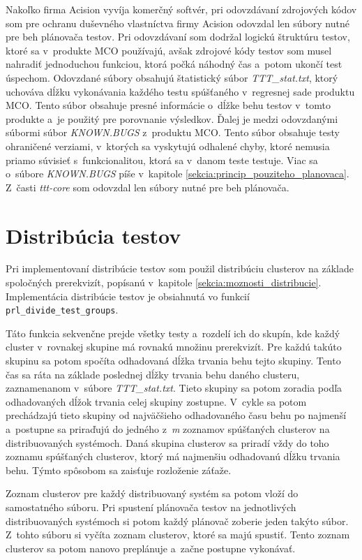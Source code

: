 Nakoľko firma Acision vyvíja komerčný softvér, pri odovzdávaní zdrojových 
kódov  som pre ochranu duševného vlastníctva firmy Acision odovzdal len 
súbory nutné pre beh plánovača testov. 
Pri odovzdávaní som dodržal logickú štruktúru testov, ktoré sa
v~produkte MCO používajú, avšak zdrojové kódy testov som musel nahradiť 
jednoduchou funkciou, ktorá počká náhodný čas a~potom ukončí test úspechom.
Odovzdané súbory obsahujú štatistický súbor \textit{TTT\_stat.txt}, 
ktorý uchováva dĺžku vykonávania každého testu spúšťaného v~regresnej 
sade produktu MCO. Tento súbor obsahuje presné informácie o~dĺžke
behu testov v~tomto produkte a~je použitý pre porovnanie výsledkov.
Ďalej je medzi odovzdanými súbormi súbor \textit{KNOWN.BUGS} z~produktu MCO. 
Tento súbor obsahuje testy ohraničené verziami, v~ktorých sa vyskytujú 
odhalené chyby, ktoré nemusia priamo súvisieť s~funkcionalitou, ktorá sa 
v~danom teste testuje. Viac sa o~súbore \textit{KNOWN.BUGS} píše v~kapitole 
\ref{sekcia:princip_pouziteho_planovaca}.
Z~časti \textit{ttt-core} som odovzdal len súbory nutné pre beh plánovača. 

\section{Distribúcia testov}
\label{sekcia:distribucia_testov}
Pri implementovaní distribúcie testov som použil distribúciu clusterov 
na základe spoločných prerekvizít, popísanú v~kapitole 
\ref{sekcia:moznosti_distribucie}.
Implementácia distribúcie testov je obsiahnutá vo funkcií 
\texttt{prl\_divide\_test\_groups}.

Táto funkcia sekvenčne prejde všetky testy a~rozdelí ich do skupín, 
kde každý cluster v~rovnakej skupine má rovnakú množinu prerekvizít. 
Pre každú takúto skupinu sa potom spočíta odhadovaná dĺžka trvania behu tejto skupiny.
Tento čas sa ráta na základe poslednej dĺžky trvania behu daného clusteru, 
zaznamenanom v~súbore \textit{TTT\_stat.txt}.
Tieto skupiny sa potom zoradia podľa odhadovaných dĺžok trvania celej 
skupiny zostupne. V~cykle sa potom prechádzajú tieto skupiny od 
najväčšieho odhadovaného času behu po najmenší a~postupne sa priraďujú 
do jedného z~\emph{m} zoznamov spúšťaných clusterov na distribuovaných systémoch.
Daná skupina clusterov sa priradí vždy do toho zoznamu spúšťaných clusterov, 
ktorý má najmenšiu odhadovanú dĺžku trvania behu. 
Týmto spôsobom sa zaisťuje rozloženie záťaže. 

Zoznam clusterov pre každý distribuovaný systém sa potom vloží do 
samostatného súboru. Pri spustení plánovača testov na jednotlivých 
distribuovaných systémoch si potom každý plánovač zoberie jeden 
takýto súbor. Z~tohto súboru si vyčíta zoznam clusterov, ktoré sa 
majú spustiť. Tento zoznam clusterov sa potom nanovo preplánuje a~začne 
postupne vykonávať.

